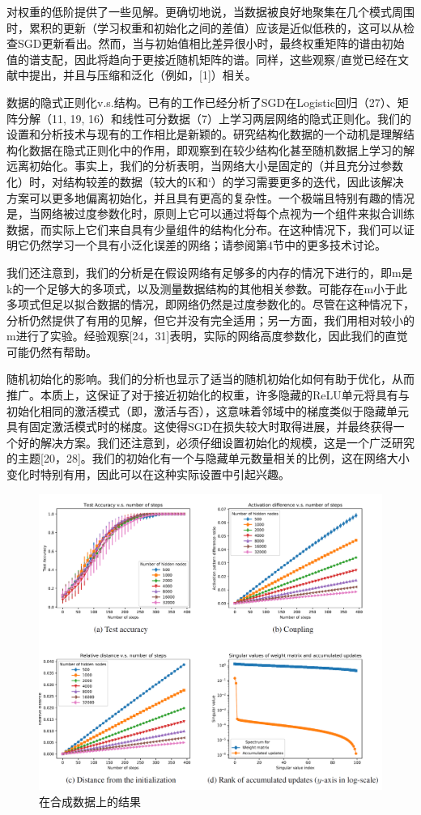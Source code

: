 \par
对权重的低阶提供了一些见解。更确切地说，当数据被良好地聚集在几个模式周围时，累积的更新（学习权重和初始化之间的差值）应该是近似低秩的，这可以从检查SGD更新看出。然而，当与初始值相比差异很小时，最终权重矩阵的谱由初始值的谱支配，因此将趋向于更接近随机矩阵的谱。同样，这些观察/直觉已经在文献中提出，并且与压缩和泛化（例如，[1]）相关。
\par
数据的隐式正则化v.s.结构。已有的工作已经分析了SGD在Logistic回归（27）、矩阵分解（11, 19, 16）和线性可分数据（7）上学习两层网络的隐式正则化。我们的设置和分析技术与现有的工作相比是新颖的。研究结构化数据的一个动机是理解结构化数据在隐式正则化中的作用，即观察到在较少结构化甚至随机数据上学习的解远离初始化。事实上，我们的分析表明，当网络大小是固定的（并且充分过参数化）时，对结构较差的数据（较大的K和‘）的学习需要更多的迭代，因此该解决方案可以更多地偏离初始化，并且具有更高的复杂性。一个极端且特别有趣的情况是，当网络被过度参数化时，原则上它可以通过将每个点视为一个组件来拟合训练数据，而实际上它们来自具有少量组件的结构化分布。在这种情况下，我们可以证明它仍然学习一个具有小泛化误差的网络；请参阅第4节中的更多技术讨论。
\par
我们还注意到，我们的分析是在假设网络有足够多的内存的情况下进行的，即m是k的一个足够大的多项式，以及测量数据结构的其他相关参数。可能存在m小于此多项式但足以拟合数据的情况，即网络仍然是过度参数化的。尽管在这种情况下，分析仍然提供了有用的见解，但它并没有完全适用；另一方面，我们用相对较小的m进行了实验。经验观察[24，31]表明，实际的网络高度参数化，因此我们的直觉可能仍然有帮助。
\par
随机初始化的影响。我们的分析也显示了适当的随机初始化如何有助于优化，从而推广。本质上，这保证了对于接近初始化的权重，许多隐藏的ReLU单元将具有与初始化相同的激活模式（即，激活与否），这意味着邻域中的梯度类似于隐藏单元具有固定激活模式时的梯度。这使得SGD在损失较大时取得进展，并最终获得一个好的解决方案。我们还注意到，必须仔细设置初始化的规模，这是一个广泛研究的主题[20，28]。我们的初始化有一个与隐藏单元数量相关的比例，这在网络大小变化时特别有用，因此可以在这种实际设置中引起兴趣。

\begin{figure}
\centering
\includegraphics[width=12cm]{./figures/results.png}
\caption{在合成数据上的结果}
\end{figure}


